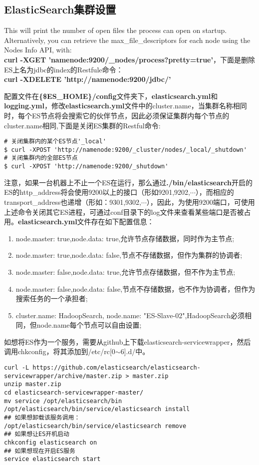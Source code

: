 \subsection{ElasticSearch集群设置}
This will print the number of open files the process can open on startup. Alternatively, you can retrieve the max\_file\_descriptors for each node using the Nodes Info API, with:\\
\textbf{curl -XGET 'namenode:9200/\_nodes/process?pretty=true'}，下面是删除ES上名为jdbc的index的Restfule命令：\\
\textbf{curl -XDELETE 'http://namenode:9200/jdbc/'}
\par 配置文件在\textbf{\{\$ES\_HOME\}/config}文件夹下，\textbf{elasticsearch.yml}和\textbf{logging.yml}，修改\textbf{elasticsearch.yml}文件中的cluster.name，当集群名称相同时，每个ES节点将会搜索它的伙伴节点，因此必须保证集群内每个节点的cluster.name相同,下面是关闭ES集群的Restful命令:
\begin{verbatim}
# 关闭集群内的某个ES节点'_local'
$ curl -XPOST 'http://namenode:9200/_cluster/nodes/_local/_shutdown'
# 关闭集群内的全部ES节点
$ curl -XPOST 'http://namenode:9200/_shutdown'
\end{verbatim}
\par 注意，如果一台机器上不止一个ES在运行，那么通过\textbf{./bin/elasticsearch}开启的ES的http\_address将会使用9200以上的接口（形如9201,9202,$\cdots$），而相应的transport\_address也递增（形如：9301,9302,$\cdots$），因此，为使用9200端口，可使用上述命令关闭其它ES进程，可通过conf目录下的log文件来查看某些端口是否被占用。\textbf{elasticsearch.yml}文件存在如下配置信息：
\begin{enumerate}[(1)]
\item node.master: true,node.data: true,允许节点存储数据，同时作为主节点;
\item node.master: true,node.data: false,节点不存储数据，但作为集群的协调者;
\item node.master: false,node.data: true,允许节点存储数据，但不作为主节点;
\item node.master: false,node.data: false,节点不存储数据，也不作为协调者，但作为搜索任务的一个承担者;
\item cluster.name: HadoopSearch, node.name: "ES-Slave-02",HadoopSearch必须相同，但node.name每个节点可以自由设置;
\end{enumerate}
如想将ES作为一个服务，需要从github上下载elasticsearch-servicewrapper，然后调用chkconfig，将其添加到/etc/rc[0$\sim$6].d/中。
\begin{verbatim}
curl -L https://github.com/elasticsearch/elasticsearch-servicewrapper/archive/master.zip > master.zip
unzip master.zip
cd elasticsearch-servicewrapper-master/
mv service /opt/elasticsearch/bin
/opt/elasticsearch/bin/service/elasticsearch install
## 如果想卸载该服务调用：
/opt/elasticsearch/bin/service/elasticsearch remove
## 如果想让ES开机启动
chkconfig elasticsearch on  
## 如果想现在开启ES服务
service elasticsearch start 
\end{verbatim}
